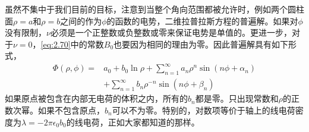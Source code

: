 \documentclass[12pt]{book}
\numberwithin{equation}{chapter}
\numberwithin{figure}{chapter}
\numberwithin{footnote}{page}
\begin{document}
虽然不集中于我们目前的目标，注意到当整个角向范围都被允许时，例如两个圆柱面$\rho=a$和$\rho=b$之间的作为$\phi$的函数的电势，二维拉普拉斯方程的普遍解。如果对$\phi$没有限制，$\nu$必须是一个正整数或负整数或零来保证电势是单值的。更进一步，对于$\nu=0$，\autoref{eq:2.70}中的常数$B_0$也要因为相同的理由为零。因此普遍解具有如下形式，
\begin{equation}\label{eq:2.71}
    \begin{aligned}
        \Phi(\rho,\phi)=&a_0+b_0\ln\rho+\sum_{n=1}^\infty a_n\rho^n\sin(n\phi+\alpha_n)\\
        &+\sum_{n=1}^\infty b_n\rho^{-n}\sin(n\phi+\beta_n)
    \end{aligned}
\end{equation}
如果原点被包含在内部无电荷的体积之内，所有的$b_n$都是零。只出现常数和$\rho$的正数次幂。如果不包含原点，$b_n$可以不为零。特别的，对数项等价于轴上的线电荷密度为$\lambda=-2\pi\epsilon_0 b_0$的线电荷，正如大家都知道的那样。
\end{document}
